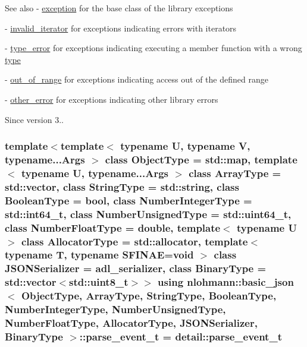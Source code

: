 \begin{DoxySeeAlso}{See also}
-\/ \hyperlink{classnlohmann_1_1basic__json_a14824c27188d2fee4861806cd5f23d22}{exception} for the base class of the library exceptions 

-\/ \hyperlink{classnlohmann_1_1basic__json_a6ccc9788413fd58de998fe92743cb4aa}{invalid\+\_\+iterator} for exceptions indicating errors with iterators 

-\/ \hyperlink{classnlohmann_1_1basic__json_ace5bf851eafe85bd6332f978991bc11c}{type\+\_\+error} for exceptions indicating executing a member function with a wrong \hyperlink{classnlohmann_1_1basic__json_a5b7c4b35a0ad9f97474912a08965d7ad}{type} 

-\/ \hyperlink{classnlohmann_1_1basic__json_a2251d8523fa6d16c0fba6388ffa2ef8c}{out\+\_\+of\+\_\+range} for exceptions indicating access out of the defined range 

-\/ \hyperlink{classnlohmann_1_1basic__json_a6fc373c99facc37aadbc5651b3d6631d}{other\+\_\+error} for exceptions indicating other library errors
\end{DoxySeeAlso}
\begin{DoxySince}{Since}
version 3.. 
\end{DoxySince}
\subsubsection[{\texorpdfstring{parse\+\_\+event\+\_\+t}{parse_event_t}}]{\setlength{\rightskip}{0pt plus 5cm}template$<$template$<$ typename U, typename V, typename...\+Args $>$ class Object\+Type = std\+::map, template$<$ typename U, typename...\+Args $>$ class Array\+Type = std\+::vector, class String\+Type  = std\+::string, class Boolean\+Type  = bool, class Number\+Integer\+Type  = std\+::int64\+\_\+t, class Number\+Unsigned\+Type  = std\+::uint64\+\_\+t, class Number\+Float\+Type  = double, template$<$ typename U $>$ class Allocator\+Type = std\+::allocator, template$<$ typename T, typename S\+F\+I\+N\+A\+E=void $>$ class J\+S\+O\+N\+Serializer = adl\+\_\+serializer, class Binary\+Type  = std\+::vector$<$std\+::uint8\+\_\+t$>$$>$ using {\bf nlohmann\+::basic\+\_\+json}$<$ Object\+Type, Array\+Type, String\+Type, Boolean\+Type, Number\+Integer\+Type, Number\+Unsigned\+Type, Number\+Float\+Type, Allocator\+Type, J\+S\+O\+N\+Serializer, Binary\+Type $>$\+::{\bf parse\+\_\+event\+\_\+t} =  {\bf detail\+::parse\+\_\+event\+\_\+t}}\hypertarget{classnlohmann_1_1basic__json_a24086b03c5c063849df0307f78c41c54}{}\label{classnlohmann_1_1basic__json_a24086b03c5c063849df0307f78c41c54}


